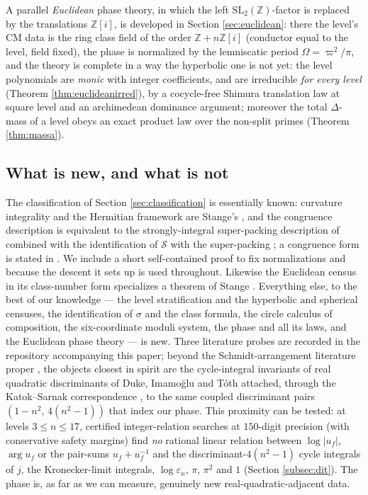 \documentclass[11pt]{amsart}
\numberwithin{equation}{section}
\theoremstyle{plain}
\theoremstyle{definition}
\theoremstyle{remark}
\newcommand{\Z}{\mathbb{Z}}
\newcommand{\Zi}{\Z[i]}
\newcommand{\SL}{\mathrm{SL}}
\newcommand{\Sarr}{\mathcal{S}}
\begin{document}
A parallel \emph{Euclidean} phase theory, in which the left
$\SL_2(\Z)$-factor is replaced by the translations $\Zi$, is developed in
Section \ref{sec:euclidean}: there the level's CM data is the ring class
field of the order $\Z + n\Zi$ (conductor equal to the level, field
fixed), the phase is normalized by the lemniscatic period
$\Omega = \varpi^2/\pi$, and the theory is complete in a way the
hyperbolic one is not yet: the level polynomials are \emph{monic} with
integer coefficients, and are irreducible \emph{for every level}
(Theorem \ref{thm:euclideanirred}), by a cocycle-free Shimura translation
law at square level and an archimedean dominance argument; moreover the
total $\Delta$-mass of a level obeys an exact product law over the
non-split primes (Theorem \ref{thm:massa}).

\subsection*{What is new, and what is not}
The classification of Section \ref{sec:classification} is essentially
known: curvature integrality and the Hermitian framework are Stange's
\cite{StangeIMRN}, and the congruence description is equivalent to the
strongly-integral super-packing description of \cite{GLMWY2006} combined
with the identification of $\Sarr$ with the super-packing
\cite{StangeTAMS}; a congruence form is stated in
\cite{RickardsStange2026}.  We include a short self-contained proof to fix
normalizations and because the descent it sets up is used throughout.
Likewise the Euclidean census in its class-number form specializes a
theorem of Stange \cite{StangeIMRN}.  Everything else, to the best of our
knowledge --- the level stratification and the hyperbolic and spherical
censuses, the identification of $\sigma$ and the class formula, the
circle calculus of composition, the six-coordinate moduli system, the
phase and all its laws, and the Euclidean phase theory --- is new.  Three
literature probes are recorded in the repository accompanying this paper;
beyond the Schmidt-arrangement literature proper
\cite{Schmidt1975, StangeTAMS, StangeIMRN, RickardsStange2026,
Martin2022}, the objects closest in spirit are the cycle-integral
invariants of real quadratic discriminants of Duke, Imamo\u{g}lu and
T\'oth \cite{DIT2011} attached, through the Katok--Sarnak correspondence
\cite{KatokSarnak1993}, to the same coupled discriminant pairs
$(1-n^2,\, 4(n^2-1))$ that index our phase.  This proximity can be tested:
at levels $3 \le n \le 17$, certified integer-relation searches at
$150$-digit precision (with conservative safety margins) find \emph{no}
rational linear relation between $\log|u_f|$, $\arg u_f$ or the pair-sums
$u_f + u_f^{-1}$ and the discriminant-$4(n^2-1)$ cycle integrals of $j$,
the Kronecker-limit integrals, $\log\varepsilon_n$, $\pi$, $\pi^2$ and
$1$ (Section \ref{subsec:dit}).  The phase is, as far as we can measure,
genuinely new real-quadratic-adjacent data.
\end{document}
